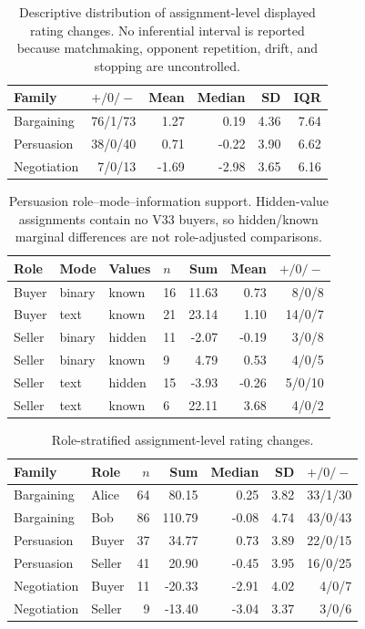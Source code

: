 \begin{table}[t]
\caption{Descriptive distribution of assignment-level displayed rating changes. No inferential interval is reported because matchmaking, opponent repetition, drift, and stopping are uncontrolled.}
\label{tab:v33-distribution}
\centering\scriptsize
\begin{tabular}{lrrrrr}
\toprule
Family & $+ / 0 / -$ & Mean & Median & SD & IQR \\
\midrule
Bargaining & 76/1/73 & 1.27 & 0.19 & 4.36 & 7.64 \\
Persuasion & 38/0/40 & 0.71 & -0.22 & 3.90 & 6.62 \\
Negotiation & 7/0/13 & -1.69 & -2.98 & 3.65 & 6.16 \\
\bottomrule
\end{tabular}
\end{table}

\begin{table}[t]
\caption{Persuasion role--mode--information support. Hidden-value assignments contain no V33 buyers, so hidden/known marginal differences are not role-adjusted comparisons.}
\label{tab:v33-persuasion-support}
\centering\scriptsize
\begin{tabular}{llllrrr}
\toprule
Role & Mode & Values & $n$ & Sum & Mean & $+ / 0 / -$ \\
\midrule
Buyer & binary & known & 16 & 11.63 & 0.73 & 8/0/8 \\
Buyer & text & known & 21 & 23.14 & 1.10 & 14/0/7 \\
Seller & binary & hidden & 11 & -2.07 & -0.19 & 3/0/8 \\
Seller & binary & known & 9 & 4.79 & 0.53 & 4/0/5 \\
Seller & text & hidden & 15 & -3.93 & -0.26 & 5/0/10 \\
Seller & text & known & 6 & 22.11 & 3.68 & 4/0/2 \\
\bottomrule
\end{tabular}
\end{table}

\begin{table}[t]
\caption{Role-stratified assignment-level rating changes.}
\label{tab:v33-role-distribution}
\centering\scriptsize
\begin{tabular}{llrrrrr}
\toprule
Family & Role & $n$ & Sum & Median & SD & $+ / 0 / -$ \\
\midrule
Bargaining & Alice & 64 & 80.15 & 0.25 & 3.82 & 33/1/30 \\
Bargaining & Bob & 86 & 110.79 & -0.08 & 4.74 & 43/0/43 \\
Persuasion & Buyer & 37 & 34.77 & 0.73 & 3.89 & 22/0/15 \\
Persuasion & Seller & 41 & 20.90 & -0.45 & 3.95 & 16/0/25 \\
Negotiation & Buyer & 11 & -20.33 & -2.91 & 4.02 & 4/0/7 \\
Negotiation & Seller & 9 & -13.40 & -3.04 & 3.37 & 3/0/6 \\
\bottomrule
\end{tabular}
\end{table}

